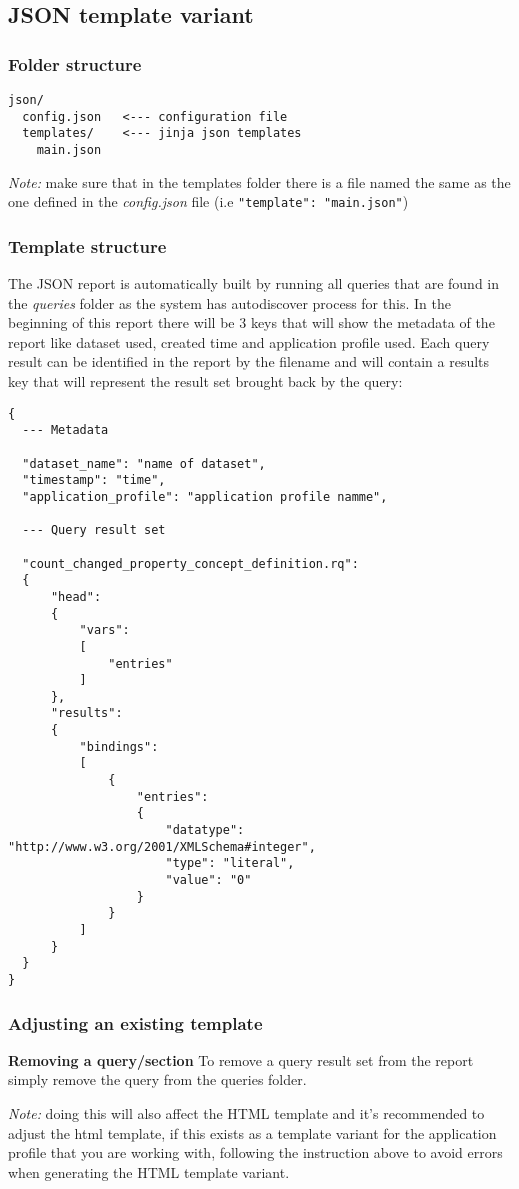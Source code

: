 \subsection{JSON template variant}
\subsubsection{Folder structure}

\begin{lstlisting}
json/
  config.json   <--- configuration file
  templates/    <--- jinja json templates
    main.json
\end{lstlisting}

\textit{Note:} make sure that in the templates folder there is a file named the same as the one defined in the \textit{config.json} file (i.e \texttt{"template": "main.json"})

\subsubsection{Template structure}
The JSON report is automatically built by running all queries that are found in the \textit{queries} folder as the system has autodiscover process for this. In the beginning of this report there will be 3 keys that will show the metadata of the report like dataset used, created time and application profile used. Each query result can be identified in the report by the filename and will contain a results key that will represent the result set brought back by the query:

\begin{lstlisting}
{
  --- Metadata
  
  "dataset_name": "name of dataset",
  "timestamp": "time",
  "application_profile": "application profile namme",
  
  --- Query result set
  
  "count_changed_property_concept_definition.rq":
  {
      "head":
      {
          "vars":
          [
              "entries"
          ]
      },
      "results":
      {
          "bindings":
          [
              {
                  "entries":
                  {
                      "datatype": "http://www.w3.org/2001/XMLSchema#integer",
                      "type": "literal",
                      "value": "0"
                  }
              }
          ]
      }
  }
}
\end{lstlisting}

\subsubsection{Adjusting an existing template}
\textbf{Removing a query/section}
To remove a query result set from the report simply remove the query from the queries folder.

\textit{Note:} doing this will also affect the HTML template and it's recommended to adjust the html template, if this exists as a template variant for the application profile that you are working with, following the instruction above to avoid errors when generating the HTML template variant.